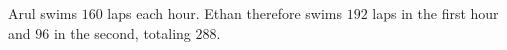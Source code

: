 Arul swims $160$ laps each hour. Ethan therefore swims $192$ laps in the first hour and $96$ in the second, totaling $\boxed{288}$.
